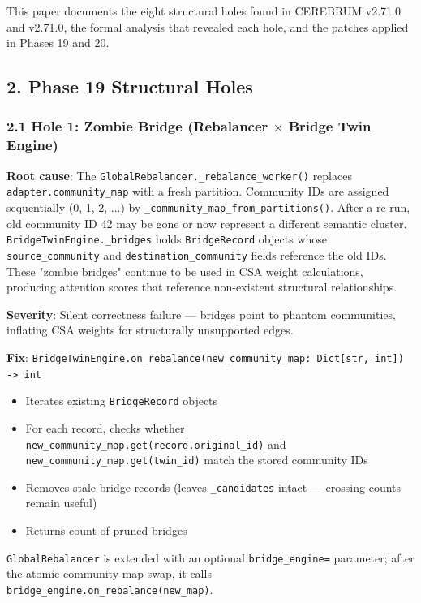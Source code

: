 This paper documents the eight structural holes found in CEREBRUM v2.71.0 and v2.71.0, the formal analysis that revealed each hole, and the patches applied in Phases 19 and 20.

\subsection*{2. Phase 19 Structural Holes}

\subsubsection*{2.1 Hole 1: Zombie Bridge (Rebalancer $\times$ Bridge Twin Engine)}

\textbf{Root cause}: The \texttt{GlobalRebalancer.\_rebalance\_worker()} replaces \texttt{adapter.community\_map} with a fresh partition. Community IDs are assigned sequentially (0, 1, 2, ...) by \texttt{\_community\_map\_from\_partitions()}. After a re-run, old community ID 42 may be gone or now represent a different semantic cluster. \texttt{BridgeTwinEngine.\_bridges} holds \texttt{BridgeRecord} objects whose \texttt{source\_community} and \texttt{destination\_community} fields reference the old IDs. These "zombie bridges" continue to be used in CSA weight calculations, producing attention scores that reference non-existent structural relationships.

\textbf{Severity}: Silent correctness failure --- bridges point to phantom communities, inflating CSA weights for structurally unsupported edges.

\textbf{Fix}: \texttt{BridgeTwinEngine.on\_rebalance(new\_community\_map: Dict[str, int]) -> int}
\begin{itemize}
  \item Iterates existing \texttt{BridgeRecord} objects
  \item For each record, checks whether \texttt{new\_community\_map.get(record.original\_id)} and \texttt{new\_community\_map.get(twin\_id)} match the stored community IDs
  \item Removes stale bridge records (leaves \texttt{\_candidates} intact --- crossing counts remain useful)
  \item Returns count of pruned bridges
\end{itemize}


\texttt{GlobalRebalancer} is extended with an optional \texttt{bridge\_engine=} parameter; after the atomic community-map swap, it calls \texttt{bridge\_engine.on\_rebalance(new\_map)}.

